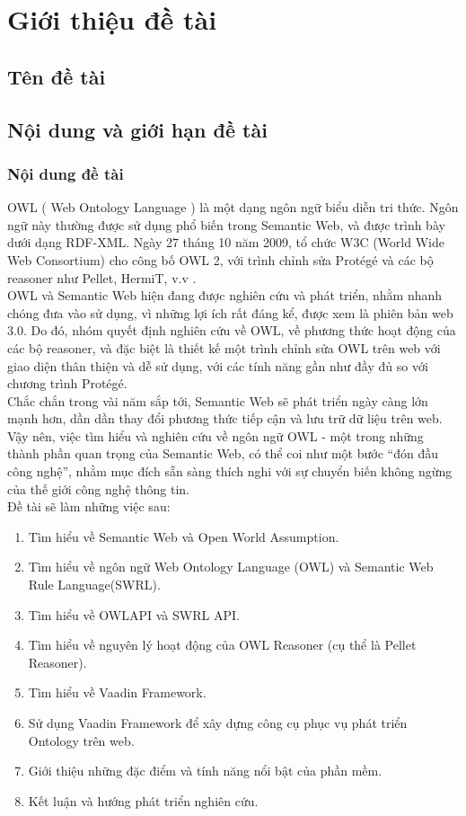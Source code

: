 \chapter {Giới thiệu đề tài}
\section{Tên đề tài}

\section{Nội dung và giới hạn đề tài}
\subsection{Nội dung đề tài}
OWL ( Web Ontology Language ) là một dạng ngôn ngữ biểu diễn tri thức. Ngôn ngữ này thường được sử dụng phổ biến trong Semantic Web, và được trình bày dưới dạng RDF-XML. Ngày 27 tháng 10 năm 2009, tổ chức W3C (World Wide Web Consortium) cho công bố OWL 2, với trình chỉnh sửa Protégé và các bộ reasoner như Pellet, HermiT, v.v .
\\
OWL và Semantic Web hiện đang được nghiên cứu và phát triển, nhằm nhanh chóng đưa vào sử dụng, vì những lợi ích rất đáng kể, được xem là phiên bản web 3.0. Do đó, nhóm quyết định nghiên cứu về OWL, về phương thức hoạt động của các bộ reasoner, và đặc biệt là thiết kế một trình chỉnh sửa OWL trên web với giao diện thân thiện và dễ sử dụng, với các tính năng gần như đầy đủ so với chương trình Protégé. 
\\
Chắc chắn trong vài năm sắp tới, Semantic Web sẽ phát triển ngày càng lớn mạnh hơn, dần dần thay đổi phương thức tiếp cận và lưu trữ dữ liệu trên web. Vậy nên, việc tìm hiểu và nghiên cứu về ngôn ngữ OWL - một trong những thành phần quan trọng của Semantic Web, có thể coi như một bước “đón đầu công nghệ”, nhằm mục đích sẵn sàng thích nghi với sự chuyển biến không ngừng của thế giới công nghệ thông tin.
\\
Đề tài sẽ làm những việc sau:
\begin{enumerate}
\item Tìm hiểu về Semantic Web và Open World Assumption.
\item Tìm hiểu về ngôn ngữ Web Ontology Language (OWL) và Semantic Web Rule Language(SWRL).
\item Tìm hiểu về OWLAPI và SWRL API.
\item Tìm hiểu về nguyên lý hoạt động của OWL Reasoner (cụ thể là Pellet Reasoner).
\item Tìm hiểu về Vaadin Framework.
\item Sử dụng Vaadin Framework để xây dựng công cụ phục vụ phát triển Ontology trên web.
\item Giới thiệu những đặc điểm và tính năng nổi bật của phần mềm.
\item Kết luận và hướng phát triển nghiên cứu.
\end{enumerate}
